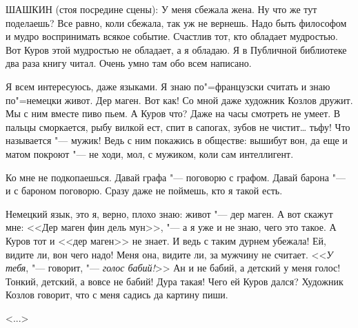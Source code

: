 ШАШКИН (стоя посредине сцены): У меня сбежала жена. Ну что же тут поделаешь? Все равно, коли сбежала, так уж не вернешь. Надо быть философом и мудро воспринимать всякое событие. Счастлив тот, кто обладает мудростью. Вот Куров этой мудростью не обладает, а я обладаю. Я в Публичной библиотеке два раза книгу читал. Очень умно там обо всем написано.

Я всем интересуюсь, даже языками. Я знаю по"=французски считать и знаю по"=немецки живот. Дер маген. Вот как! Со мной даже художник Козлов дружит. Мы с ним вместе пиво пьем. А Куров что? Даже на часы смотреть не умеет. В пальцы сморкается, рыбу вилкой ест, спит в сапогах, зубов не чистит\dots{} тьфу! Что называется "--- мужик! Ведь с ним покажись в обществе: вышибут вон, да еще и матом покроют "--- не ходи, мол, с мужиком, коли сам интеллигент.

Ко мне не подкопаешься. Давай графа "--- поговорю с графом. Давай барона "--- и с бароном поговорю. Сразу даже не поймешь, кто я такой есть.

Немецкий язык, это я, верно, плохо знаю: живот "--- дер маген. А вот скажут мне: <<Дер маген фин дель мун>>, "--- а я уже и не знаю, чего это такое. А Куров тот и <<дер маген>> не знает. И ведь с таким дурнем убежала! Ей, видите ли, вон чего надо! Меня она, видите ли, за мужчину не считает. <<\textit{У тебя}, "--- говорит, "--- \textit{голос бабий!}>> Ан и не бабий, а детский у меня голос! Тонкий, детский, а вовсе не бабий! Дура такая! Чего ей Куров дался? Художник Козлов говорит, что с меня садись да картину пиши.

\hfill <...>
